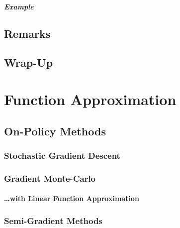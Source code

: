                 \paragraph{Example} %

    \section{Remarks} %

    \section{Wrap-Up} %

\chapter{Function Approximation} %

    \section{On-Policy Methods} %

        \subsection{Stochastic Gradient Descent} %

        \subsection{Gradient Monte-Carlo} %

            \subsubsection{\dots with Linear Function Approximation} %

        \subsection{Semi-Gradient Methods} %

